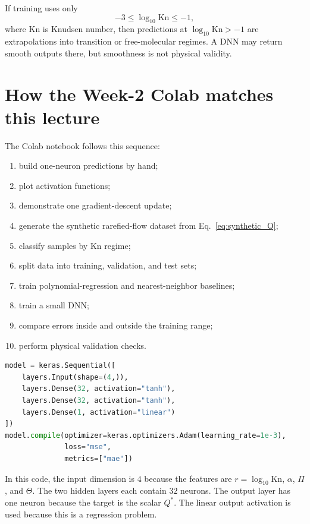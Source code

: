 \documentclass[11pt]{article}
\newcommand{\kn}{\mathrm{Kn}}
\begin{document}
If training uses only
\begin{equation}
    -3\le \log_{10}\kn \le -1,
    \label{eq:train_kn_range}
\end{equation}
where $\kn$ is Knudsen number, then predictions at $\log_{10}\kn> -1$ are extrapolations into transition or free-molecular regimes.  A DNN may return smooth outputs there, but smoothness is not physical validity.

\section{How the Week-2 Colab matches this lecture}

The Colab notebook follows this sequence:
\begin{enumerate}
    \item build one-neuron predictions by hand;
    \item plot activation functions;
    \item demonstrate one gradient-descent update;
    \item generate the synthetic rarefied-flow dataset from Eq.~\eqref{eq:synthetic_Q};
    \item classify samples by $\kn$ regime;
    \item split data into training, validation, and test sets;
    \item train polynomial-regression and nearest-neighbor baselines;
    \item train a small DNN;
    \item compare errors inside and outside the training range;
    \item perform physical validation checks.
\end{enumerate}

\begin{lstlisting}[language=Python,caption={Typical Keras model for the Week-2 lab.}]
model = keras.Sequential([
    layers.Input(shape=(4,)),
    layers.Dense(32, activation="tanh"),
    layers.Dense(32, activation="tanh"),
    layers.Dense(1, activation="linear")
])
model.compile(optimizer=keras.optimizers.Adam(learning_rate=1e-3),
              loss="mse",
              metrics=["mae"])
\end{lstlisting}

In this code, the input dimension is $4$ because the features are $r=\log_{10}\kn$, $\alpha$, $\Pi$, and $\Theta$.  The two hidden layers each contain $32$ neurons.  The output layer has one neuron because the target is the scalar $Q^*$.  The linear output activation is used because this is a regression problem.
\end{document}
